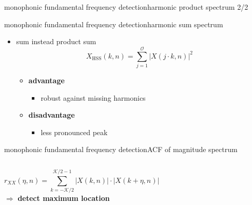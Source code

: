 	\begin{frame}{monophonic fundamental frequency detection}{harmonic product spectrum 2/2}
	\end{frame}
	
	\begin{frame}{monophonic fundamental frequency detection}{harmonic sum spectrum}
        \begin{itemize}
            \item   sum instead product sum
        \begin{equation*}\label{eq:hss}
            X_{\mathrm{HSS}}(k,n) = \sum\limits_{j=1}^{\mathcal{O}}{|X(j\cdot k,n)|^2} 
        \end{equation*}
        \bigskip

                \begin{itemize}
                    \item<1->   \textbf{advantage}
                        \begin{itemize}
                            \item   robust against missing harmonics
                        \end{itemize}
                    \item<1->   \textbf{disadvantage}
                        \begin{itemize}
                            \item   less pronounced peak
                        \end{itemize}
                \end{itemize}
        \end{itemize}
	\end{frame}
	
	\begin{frame}{monophonic fundamental frequency detection}{ACF of magnitude spectrum}
        \vspace{-3mm}
        \begin{columns}
		\begin{equation*}
			r_{XX}(\eta,n) = \sum\limits_{k=-\mathcal{K}/2}^{\mathcal{K}/2-1}{|X(k,n)|\cdot |X(k+\eta,n)|}
		\end{equation*}
		$\Rightarrow$ \textbf{detect maximum location}
        
        \end{columns}
	\end{frame}
	
